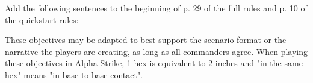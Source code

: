 
Add the following sentences to the beginning of p. 29 of the full rules and p. 10 of the quickstart rules:

These objectives may be adapted to best support the scenario format or the narrative the players are creating, as long as all commanders agree.
When playing these objectives in Alpha Strike, 1 hex is equivalent to 2 inches and "in the same hex" means "in base to base contact".
